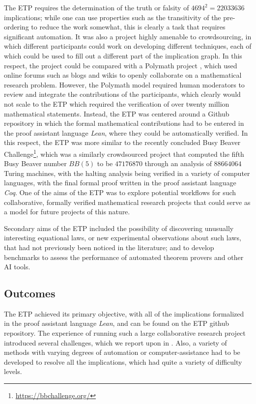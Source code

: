 The ETP requires the determination of the truth or falsity of $4694^2 = 22033636$ implications; while one can use properties such as the transitivity of the pre-ordering to reduce the work somewhat, this is clearly a task that requires significant automation.  It was also a project highly amenable to crowdsourcing, in which different participants could work on developing different techniques, each of which could be used to fill out a different part of the implication graph.  In this respect, the project could be compared with a Polymath project \cite{Gowers2009}, which used online forums such as blogs and wikis to openly collaborate on a mathematical research problem.  However, the Polymath model required human moderators to review and integrate the contributions of the participants, which clearly would not scale to the ETP which required the verification of over twenty million mathematical statements.  Instead, the ETP was centered around a Github repository in which the formal mathematical contributions had to be entered in the proof assistant language \emph{Lean}, where they could be automatically verified.  In this respect, the ETP was more similar to the recently concluded Busy Beaver Challenge\footnote{\url{https://bbchallenge.org/}}, which was a similarly crowdsourced project that computed the fifth Busy Beaver number $BB(5)$ to be $47176870$ through an analysis of $88664064$ Turing machines, with the halting analysis being verified in a variety of computer languages, with the final formal proof written in the proof assistant language \emph{Coq}.  One of the aims of the ETP was to explore potential workflows for such collaborative, formally verified mathematical research projects that could serve as a model for future projects of this nature.

Secondary aims of the ETP included the possibility of discovering unusually interesting equational laws, or new experimental observations about such laws, that had not previously been noticed in the literature; and to develop benchmarks to assess the performance of automated theorem provers and other AI tools.

\subsection{Outcomes}

The ETP achieved its primary objective, with all of the implications formalized in the proof assistant language \emph{Lean}, and can be found on the ETP github repository.  The experience of running such a large collaborative research project introduced several challenges, which we report upon in .  Also, a variety of methods with varying degrees of automation or computer-assistance had to be developed to resolve all the implications, which had quite a variety of difficulty levels.

